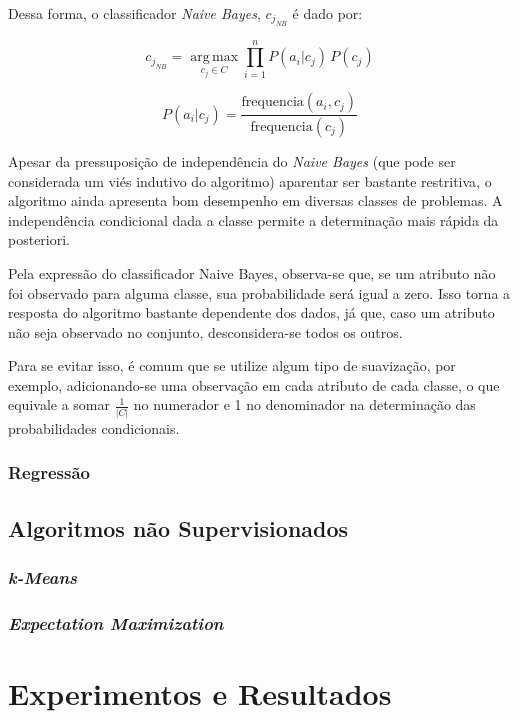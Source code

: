 \documentclass{article}
\begin{document}
Dessa forma, o classificador {\it Naive Bayes}, $c_{j_{NB}}$ é dado por:

\begin{equation}
c_{j_{NB}} = \operatorname*{arg\,max}_{c_j \in C} \prod_{i=1}^n P(a_i|c_j) \, P(c_j)
\end{equation}

\begin{equation}
P(a_i|c_j) = \frac{\mathrm{frequencia}(a_i,c_j)}{\mathrm{frequencia}(c_j)}
\end{equation}

Apesar da pressuposição de independência do {\it Naive Bayes} (que pode ser considerada um viés indutivo do algoritmo) aparentar ser bastante restritiva, o algoritmo ainda apresenta bom desempenho em diversas classes de problemas. A independência condicional dada a classe permite a determinação mais rápida da posteriori.

Pela expressão do classificador Naive Bayes, observa-se que, se um atributo não foi observado para alguma classe, sua probabilidade será igual a zero. Isso torna a resposta do algoritmo bastante dependente dos dados, já que, caso um atributo não seja observado no conjunto, desconsidera-se todos os outros.

Para se evitar isso, é comum que se utilize algum tipo de suavização, por exemplo, adicionando-se uma observação em cada atributo de cada classe, o que equivale a somar $\frac{1}{|C|}$ no numerador e 1 no denominador na determinação das probabilidades condicionais.

\subsubsection{Regressão}

\subsection{Algoritmos não Supervisionados}

\subsubsection{{\b \it k-Means}}

\subsubsection{{\b \it Expectation Maximization}}

\section{Experimentos e Resultados}
\end{document}
